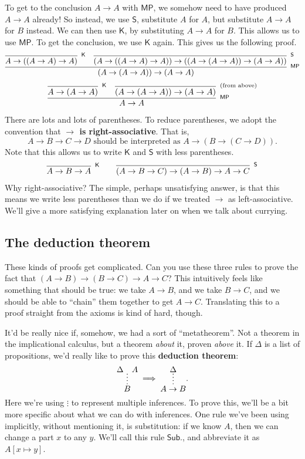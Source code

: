 \documentclass[11pt,paper=letter]{scrartcl}
\newcommand{\sf}{\mathsf}
\newcommand{\vc}[1]{\vcenter{\hbox{#1}}}
\begin{document}
To get to the conclusion $A \to A$ with $\sf{MP}$, we somehow need to have produced $A \to A$ already! So instead, we use $\sf{S}$, substitute $A$ for $A$, but substitute $A \to A$ for $B$ instead. We can then use $\sf{K}$, by substituting $A \to A$ for $B$. This allows us to use $\sf{MP}$. To get the conclusion, we use $\sf{K}$ again. This gives us the following proof.
\begin{align*}
\infer[^\sf{MP}]
{(A \to (A \to A)) \to (A \to A)}
{
  \infer[^\sf{K}]
  {A \to ((A \to A) \to A)}
  {}
  &
  \infer[^\sf{S}]
  {(A \to ((A \to A) \to A)) \to ((A \to (A \to A)) \to (A \to A))}
  {}
}
\end{align*}
\begin{align*}
\infer[^\sf{MP}]
{A \to A}
{
  \infer[^\sf{K}]
  {A \to (A \to A)}
  {}
  &
  \infer[^\text{(from above)}]
  {(A \to (A \to A)) \to (A \to A)}
  {}
}
\end{align*}
There are lots and lots of parentheses. To reduce parentheses, we adopt the convention that \textbf{$\mathbf{\to}$ is right-associative}. That is, \[
  A \to B \to C \to D \text{ should be interpreted as } A \to (B \to (C \to D)).
\]
Note that this allows us to write $\sf{K}$ and $\sf{S}$ with less parentheses.
\begin{align*}
\infer[^\sf{K}]
{A \to B \to A}
{}
\qquad
\infer[^\sf{S}]
{(A \to B \to C) \to (A \to B) \to A \to C}
{}
\end{align*}
Why right-associative? The simple, perhaps unsatisfying answer, is that this means we write less parentheses than we do if we treated $\to$ as left-associative. We'll give a more satisfying explanation later on when we talk about currying.

\subsection{The deduction theorem}

These kinds of proofs get complicated. Can you use these three rules to prove the fact that $(A \to B) \to (B \to C) \to A \to C$? This intuitively feels like something that should be true: we take $A \to B$, and we take $B \to C$, and we should be able to ``chain'' them together to get $A \to C$. Translating this to a proof straight from the axioms is kind of hard, though.

It'd be really nice if, somehow, we had a sort of ``metatheorem''. Not a theorem in the implicational calculus, but a theorem \emph{about} it, proven \emph{above} it. If $\Delta$ is a list of propositions, we'd really like to prove this \textbf{deduction theorem}:
\begin{align*}
\vc{\infer*
{B}
{\Delta & A}}
\implies
\vc{\infer*
{A \to B}
{\Delta}}.
\end{align*}
Here we're using $\vdots$ to represent multiple inferences. To prove this, we'll be a bit more specific about what we can do with inferences. One rule we've been using implicitly, without mentioning it, is substitution: if we know $A$, then we can change a part $x$ to any $y$. We'll call this rule $\sf{Sub.}$, and abbreviate it as $A[x \mapsto y]$. 
\end{document}
